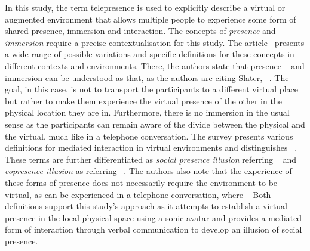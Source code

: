 In this study, the term telepresence is used to explicitly describe a virtual or augmented environment that allows multiple people to experience some form of shared presence, immersion and interaction.
The concepts of \emph{presence} and \emph{immersion} require a precise contextualisation for this study.
The article~ presents a wide range of possible variations and specific definitions for these concepts in different contexts and environments.
There, the authors state that presence ~\parencite[2]{surveyOfPresence} and immersion can be understood as  that, as the authors are citing Slater, ~\parencite[3]{surveyOfPresence}.
The goal, in this case, is not to transport the participants to a different virtual place but rather to make them experience the virtual presence of the other in the physical location they are in.
Furthermore, there is no immersion in the usual sense as the participants can remain aware of the divide between the physical and the virtual, much like in a telephone conversation.
The survey presents various definitions for mediated interaction in virtual environments and distinguishes ~\parencite[4]{surveyOfPresence}.
These terms are further differentiated as \emph{social presence illusion} referring ~\parencite[4]{surveyOfPresence} and \emph{copresence illusion} as referring ~\parencite[5]{surveyOfPresence}.
The authors also note that the experience of these forms of presence does not necessarily require the environment to be virtual, as can be experienced in a telephone conversation, where ~\parencite[5]{surveyOfPresence}
Both definitions support this study's approach as it attempts to establish a virtual presence in the local physical space using a sonic avatar and provides a mediated form of interaction through verbal communication to develop an illusion of social presence.

